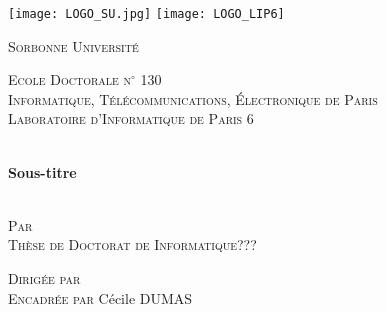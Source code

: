 \documentclass[
11pt, %
english, %
singlespacing, %
headsepline, %
]{MastersDoctoralThesis} %
\author{Eleonora \textsc{CAGLI}} %
\theoremstyle{remark}
\begin{document}
\frontmatter %

\pagestyle{plain} %


\begin{titlepage}
\texttt{[image: LOGO\_SU.jpg]}
\hfill
\texttt{[image: LOGO\_LIP6]}
\begin{center}

\vspace*{.04\textheight}
{\scshape\huge Sorbonne Universit\'e\par}\vspace{1.0cm} %
\textsc{\Large Ecole Doctorale n$^\circ$ 130 }\\
\textsc{\large Informatique, T\'el\'ecommunications, \'Electronique de Paris}\\[0.3cm]
\textsc{\large Laboratoire d'Informatique de Paris 6 }\\[0.5cm]


\HRule \\[0.3cm] %
{\huge \bfseries \ttitle\par}\vspace{0.4cm} %
{\LARGE \bfseries Sous-titre \par}\vspace{0.4cm} %
\HRule \\[1.0cm] %

\textsc{\Large Par }\href{}{\large \authorname}\\
\textsc{Th\`ese de Doctorat de Informatique???}

\vspace*{.04\textheight}
\textsc{Dirig\'ee par }\href{}{\supname}\\
\textsc{Encadr\'ee par} C\'ecile \textsc{DUMAS}
% 


\end{center}
\end{titlepage}
\end{document}
